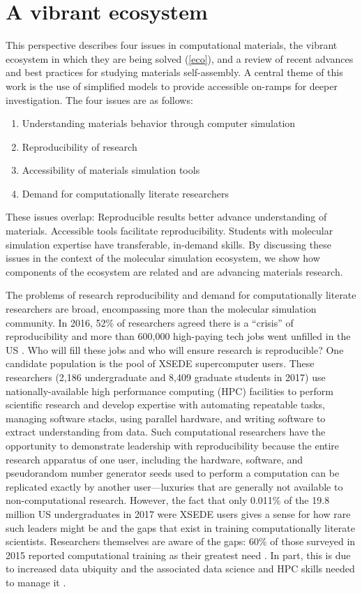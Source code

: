 \section{A vibrant ecosystem}
This perspective describes four issues in computational materials, the vibrant ecosystem in which they are being solved (\autoref{eco}), and a review of recent advances and best practices for studying materials self-assembly. 
A central theme of this work is the use of simplified models\cite{Page2018} to provide accessible on-ramps for deeper investigation.
The four issues are as follows: %
\begin{enumerate}
    \item Understanding materials behavior through computer simulation
    \item Reproducibility of research
    \item Accessibility of materials simulation tools
    \item Demand for computationally literate researchers
\end{enumerate}
These issues overlap: 
Reproducible results better advance understanding of materials.
Accessible tools facilitate reproducibility.
Students with molecular simulation expertise have transferable, in-demand skills.
By discussing these issues in the context of the molecular simulation ecosystem, we show how components of the ecosystem are related and are advancing materials research.

The problems of research reproducibility and demand for computationally literate researchers are broad, encompassing more than the molecular simulation community.
In 2016, 52\% of researchers agreed there is a ``crisis'' of reproducibility \cite{Baker2016a} and more than 600,000 high-paying tech jobs went unfilled in the US \cite{Smith2016}.
Who will fill these jobs and who will ensure research is reproducible?
One candidate population is the pool of XSEDE \cite{Towns2014} supercomputer users.
These researchers (2,186 undergraduate and 8,409 graduate students in 2017) use nationally-available high performance computing (HPC) facilities to perform scientific research \cite{Wernert2018} and develop expertise with automating repeatable tasks, managing software stacks, using parallel hardware, and writing software to extract understanding from data.
Such computational researchers have the opportunity to demonstrate leadership with reproducibility because the entire research apparatus of one user, including the hardware, software, and pseudorandom number generator seeds used to perform a computation can be replicated exactly by another user---luxuries that are generally not available to non-computational research.
However, the fact that only 0.011\% of the 19.8 million US undergraduates in 2017 were XSEDE users gives a sense for how rare such leaders might be and the gaps that exist in training computationally literate scientists.
Researchers themselves are aware of the gaps: 60\% of those surveyed in 2015 reported computational training as their greatest need \cite{Teal2015}.
In part, this is due to increased data ubiquity and the associated data science and HPC skills needed to manage it \cite{Vasilevich2017}.

